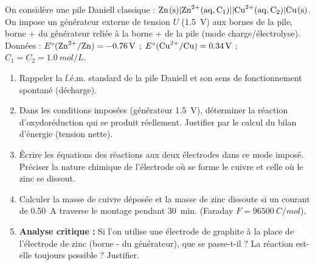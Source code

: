 \documentclass[11pt]{article}
\begin{document}
\begin{exercice}
On considère une pile Daniell classique : $\ce{Zn(s)} | \ce{Zn^{2+}(aq, C_1)} || \ce{Cu^{2+}(aq, C_2)} | \ce{Cu(s)}$.
On impose un générateur externe de tension $U$ (\SI{1,5}{V}) aux bornes de la pile, borne + du générateur reliée à la borne + de la pile (mode charge/électrolyse). Données : $E^\circ(\ce{Zn^{2+}/Zn}) = \SI{-0,76}{V}$ ; $E^\circ(\ce{Cu^{2+}/Cu}) = \SI{+0,34}{V}$ ; $C_1 = C_2 = \SI{1,0}{mol/L}$.
\begin{enumerate}
    \item Rappeler la f.é.m. standard de la pile Daniell et son sens de fonctionnement spontané (décharge).
    \item Dans les conditions imposées (générateur \SI{1,5}{V}), déterminer la réaction d'oxydoréduction qui se produit réellement. Justifier par le calcul du bilan d'énergie (tension nette).
    \item Écrire les équations des réactions aux deux électrodes dans ce mode imposé. Préciser la nature chimique de l'électrode où se forme le cuivre et celle où le zinc se dissout.
    \item Calculer la masse de cuivre déposée et la masse de zinc dissoute si un courant de \SI{0,50}{A} traverse le montage pendant \SI{30}{min}. (Faraday $F = \SI{96500}{C/mol}$).
    \item \textbf{Analyse critique :} Si l'on utilise une électrode de graphite à la place de l'électrode de zinc (borne - du générateur), que se passe-t-il ? La réaction est-elle toujours possible ? Justifier.
\end{enumerate}
\end{exercice}
\end{document}
